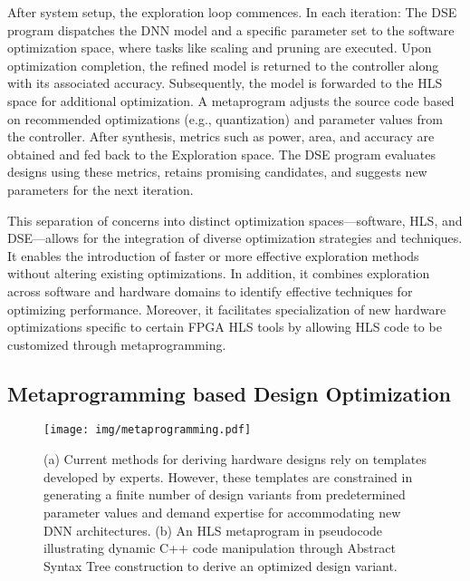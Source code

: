 After system setup, the exploration loop commences. In each iteration:  The DSE program dispatches the DNN model and a specific parameter set to the software optimization space, where tasks like scaling and pruning are executed.  Upon optimization completion, the refined model is returned to the controller along with its associated accuracy.  Subsequently, the model is forwarded to the HLS space for additional optimization. A metaprogram adjusts the source code based on recommended optimizations (e.g., quantization) and parameter values from the controller. After synthesis, metrics such as power, area, and accuracy are obtained and  fed back to the Exploration space. The DSE program evaluates designs using these metrics, retains promising candidates, and suggests new parameters for the next iteration.


This separation of concerns into distinct optimization spaces—software, HLS, and DSE—allows for the integration of diverse optimization strategies and techniques. It enables the introduction of faster or more effective exploration methods without altering existing optimizations. In addition, it combines exploration across software and hardware domains to identify effective techniques for optimizing performance. Moreover, it facilitates specialization of new hardware optimizations specific to certain FPGA HLS tools by allowing HLS code to be customized through metaprogramming.





\subsection{Metaprogramming based Design Optimization}

\begin{figure}[tp]
    \begin{center}
    \texttt{[image: img/metaprogramming.pdf]}
    \end{center}
       \caption{ (a) Current methods for deriving hardware designs rely on templates developed by experts. However, these templates are constrained in generating a finite number of design variants from predetermined parameter values and demand expertise for accommodating new DNN architectures.
(b) An HLS metaprogram in pseudocode illustrating dynamic C++ code manipulation through Abstract Syntax Tree construction to derive an optimized design variant.}
    \label{fig:metaprogramming}
\end{figure}

